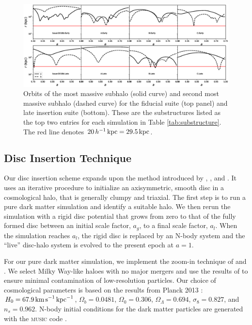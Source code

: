 \begin{figure}
	\hspace{-0.75in}
	\includegraphics[width=1.2\textwidth]{../figures/substructure_r_vs_t.eps}
	\caption{Orbits of the most massive subhalo (solid curve)
          and second most massive subhalo (dashed curve) for the
          fiducial suite (top panel) and late insertion suite
          (bottom). These are the substructures listed as the top two
          entries for each simulation in Table
          \ref{tab:substructure}. The red line denotes $20\, h^{-1} \, \text{kpc} =
          29.5 \, \text{kpc}$. } \label{fig:substructure_orbits}
\end{figure}

\subsection{Disc Insertion Technique} \label{ssec:disc_insertio}

Our disc insertion scheme \citep{bauer2018a} expands upon the method
introduced by \citet{BerentzenShlosmanStellarDisks},
\citet{debuhr_2012}, and \citet{ys_2015}. It uses an iterative
procedure to initialize an axisymmetric, smooth disc in a cosmological
halo, that is generally clumpy and triaxial. The first step is to run
a pure dark matter simulation and identify a suitable halo. We then
rerun the simulation with a rigid disc potential that grows from zero
to that of the fully formed disc between an initial scale factor,
$a_g$, to a final scale factor, $a_l$.  When the simulation reaches
$a_l$, the rigid disc is replaced by an N-body system and the ``live''
disc-halo system is evolved to the present epoch at $a=1$.

For our pure dark matter simulation, we implement the zoom-in
technique of \citet{KatzQuasarZoom} and \citet{NavarroWhiteZoom}.  We
select Milky Way-like haloes with no major mergers and use the results
of \cite{onorbe_etal_2014} to ensure minimal contamination of
low-resolution particles.  Our choice of cosmological parameters is
based on the results from Planck 2013 \citep{planck_2014}:
$H_0=67.9\,{\rm km\,s}^{-1}\,{\rm kpc}^{-1}$, $\Omega_b = 0.0481$,
$\Omega_0 = 0.306$, $\Omega_\Lambda = 0.694$, $\sigma_8 = 0.827$, and
$n_s = 0.962$. N-body initial conditions for the dark matter particles
are generated with the \textsc{music} code \citep{music}.

